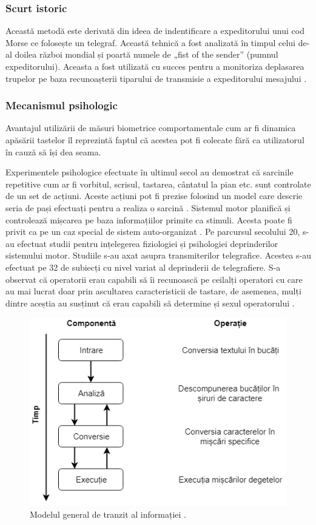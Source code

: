 \documentclass[9pt,shortpaper,twoside,web]{ieeecolor}
\begin{document}
\subsubsection{Scurt istoric}	
	Această metodă este derivată din ideea de indentificare a expeditorului unui cod Morse ce folosește un telegraf. Această tehnică a fost analizată în timpul celui de-al doilea război mondial și poartă numele de „fist of the sender” (pumnul expeditorului). Aceasta a fost utilizată cu succes pentru a monitoriza deplasarea trupelor pe baza recunoașterii tiparului de transmisie a expeditorului mesajului \cite{b2}.


\subsubsection{Mecanismul psihologic}
	Avantajul utilizării de măsuri biometrice comportamentale cum ar fi dinamica apăsării tastelor îl reprezintă faptul că acestea pot fi colecate fără ca utilizatorul în cauză să își dea seama. 
	
	Experimentele psihologice efectuate în ultimul secol au demostrat că sarcinile repetitive cum ar fi vorbitul, scrisul, tastarea, cântatul la pian etc. sunt controlate de un set de acțiuni. Aceste acțiuni pot fi prezise folosind un model care descrie seria de pași efectuați pentru a realiza o sarcină \cite{b3}. Sistemul motor planifică și controlează mișcarea pe baza informațiilor primite ca stimuli. Acesta poate fi privit ca pe un caz special de sistem auto-organizat \cite{4}. Pe parcursul secolului 20, s-au efectuat studii pentru ințelegerea fiziologiei și psihologiei deprinderilor sistemului motor. Studiile s-au axat asupra transmiterilor telegrafice. Acestea s-au efectuat pe 32 de subiecți cu nivel variat al deprinderii de telegrafiere. S-a observat că operatorii erau capabili să îi recunoască pe ceilalți operatori cu care au mai lucrat doar prin ascultarea caracteristicii de tastare, de asemenea, mulți dintre aceștia au susținut că erau capabili să determine și sexul operatorului \cite{b3}. 
	
\begin{figure}[htb]
\includegraphics[width=0.9\columnwidth]{res/fig/modelul-cooper}
\caption{Modelul general de tranzit al informației \cite{b5}.}
\label{fig1}
\end{figure}
\end{document}
